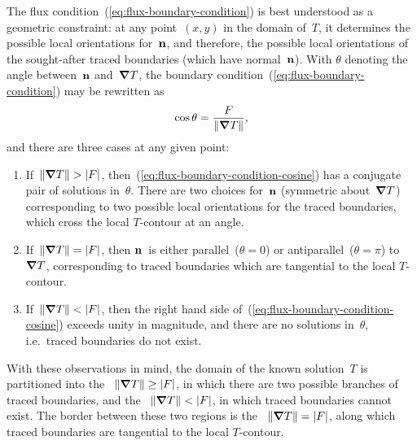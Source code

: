 The flux condition~(\ref{eq:flux-boundary-condition})
is best understood as a geometric constraint:
at any point~$(x, y)$ in the domain of~$T$,
it determines the possible local orientations for~$\mathop{}\!\boldsymbol{\mathbf{n}}$,
and therefore, the possible local orientations
of the sought-after traced boundaries
(which have normal~$\mathop{}\!\boldsymbol{\mathbf{n}}$).
With $\theta$ denoting the angle between~$\mathop{}\!\boldsymbol{\mathbf{n}}$ and~$\mathop{}\!\boldsymbol{\mathbf{\nabla}} T$,
the boundary condition~(\ref{eq:flux-boundary-condition}) may be rewritten as
\begin{equation}
  \cos\theta = \frac{F}{\lVert\mathop{}\!\boldsymbol{\mathbf{\nabla}} T\rVert},
  \label{eq:flux-boundary-condition-cosine}
\end{equation}
and there are three cases at any given point:
\begin{enumerate}
  \item
    If~$\lVert\mathop{}\!\boldsymbol{\mathbf{\nabla}} T\rVert > \lvert F\rvert$,
    then~(\ref{eq:flux-boundary-condition-cosine})
    has a conjugate pair of solutions in~$\theta$.
    There are two choices for~$\mathop{}\!\boldsymbol{\mathbf{n}}$
    (symmetric about~$\mathop{}\!\boldsymbol{\mathbf{\nabla}} T$)
    corresponding to two possible local orientations
    for the traced boundaries,
    which cross the local $T$-contour at an angle.
  \item
    If~$\lVert\mathop{}\!\boldsymbol{\mathbf{\nabla}} T\rVert = \lvert F\rvert$,
    then $\mathop{}\!\boldsymbol{\mathbf{n}}$~is either parallel~($\theta = 0$)
    or antiparallel~($\theta = \pi$) to~$\mathop{}\!\boldsymbol{\mathbf{\nabla}} T$,
    corresponding to traced boundaries which are tangential
    to the local $T$-contour.
  \item
    If~$\lVert\mathop{}\!\boldsymbol{\mathbf{\nabla}} T\rVert < \lvert F\rvert$,
    then the right hand side of~(\ref{eq:flux-boundary-condition-cosine})
    exceeds unity in magnitude,
    and there are no solutions in~$\theta$,
    i.e.~traced boundaries do not exist.
\end{enumerate}
With these observations in mind,
the domain of the known solution~$T$ is partitioned into
the ~$\lVert\mathop{}\!\boldsymbol{\mathbf{\nabla}} T\rVert \ge \lvert F\rvert$,
in which there are two possible branches of traced boundaries,
and the ~$\lVert\mathop{}\!\boldsymbol{\mathbf{\nabla}} T\rVert < \lvert F\rvert$,
in which traced boundaries cannot exist.
The border between these two regions is
the ~$\lVert\mathop{}\!\boldsymbol{\mathbf{\nabla}} T\rVert = \lvert F\rvert$,
along which traced boundaries are tangential to the local $T$-contour.

